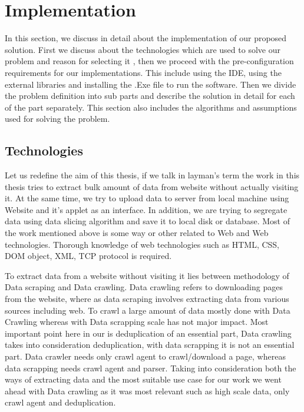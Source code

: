 \documentclass[12pt]{report}
\begin{document}
\section*{Implementation}
In this section, we discuss in detail about the implementation of our proposed solution. First we discuss about the technologies which are used to solve our problem and reason for selecting it , then we proceed with the pre-configuration requirements for our implementations. This include using the IDE, using the external libraries and installing the .Exe file to run the software. Then we divide the problem definition into sub parts and describe the solution in detail for each of the part separately. This section also includes the algorithms and assumptions used for solving the problem.
\subsection*{Technologies}
Let us redefine the aim of this thesis, if we talk in layman’s term the work in this thesis tries to extract bulk amount of data from website without actually visiting it. At the same time, we try to upload data to server from local machine using Website and it’s applet as an interface. In addition, we are trying to segregate data using data slicing algorithm and save it to local disk or database. Most of the work mentioned above is some way or other related to Web and Web technologies. Thorough knowledge of web technologies such as HTML, CSS, DOM object, XML, TCP protocol is required.

To extract data from a website without visiting it lies between methodology of Data scraping and Data crawling. Data crawling refers to downloading pages from the website, where as data scraping involves extracting data from various sources including web. To crawl a large amount of data mostly done with Data Crawling whereas with Data scrapping scale has not major impact. Most important point here in our is deduplication of an essential part, Data crawling takes into consideration deduplication, with data scrapping it is not an essential part. Data crawler needs only crawl agent to crawl/download a page, whereas data scrapping needs crawl agent and parser. Taking into consideration both the ways of extracting data and the most suitable use case for our work we went ahead with Data crawling as it was most relevant such as high scale data, only crawl agent and deduplication.
\end{document}
